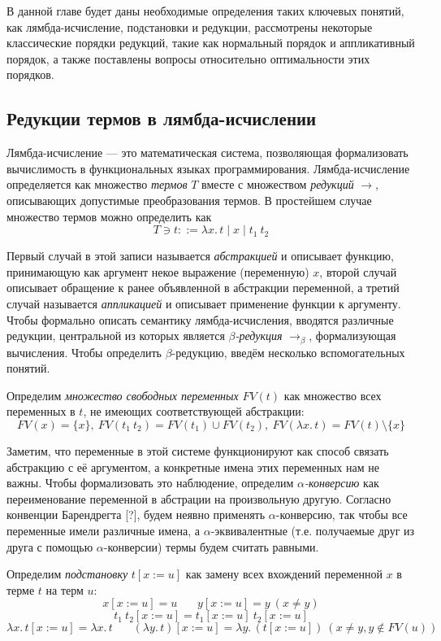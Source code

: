 \documentclass[../diploma.tex]{subfiles}
\begin{document}
\label{sec:1}

В данной главе будет даны необходимые определения таких ключевых понятий, как лямбда-исчисление, подстановки и редукции, рассмотрены некоторые классические порядки редукций, такие как нормальный порядок и аппликативный порядок, а также поставлены вопросы относительно оптимальности этих порядков.

\subsection{Редукции термов в лямбда-исчислении}

Лямбда-исчисление \cite{lambda_calculus} --- это математическая система, позволяющая формализовать вычислимость в функциональных языках программирования. Лямбда-исчисление определяется как множество \textit{термов} $T$ вместе с множеством \textit{редукций} $\rightarrow$, описывающих допустимые преобразования термов. В простейшем случае множество термов можно определить как
$$T \ni t ::= \lambda x.\, t \mid x \mid t_1\ t_2$$

Первый случай в этой записи называется \textit{абстракцией} и описывает функцию, принимающую как аргумент некое выражение (переменную) $x$, второй случай описывает обращение к ранее объявленной в абстракции переменной, а третий случай называется \textit{аппликацией} и описывает применение функции к аргументу. Чтобы формально описать семантику лямбда-исчисления, вводятся различные редукции, центральной из которых является \textit{$\beta$-редукция} $\rightarrow_\beta$, формализующая вычисления. Чтобы определить $\beta$-редукцию, введём несколько вспомогательных понятий.

Определим \textit{множество свободных переменных} $FV(t)$ как множество всех переменных в $t$, не имеющих соответствующей абстракции:
$$FV(x) = \{x\},\ FV(t_1\ t_2) = FV(t_1) \cup FV(t_2),\ FV(\lambda x.\, t) = FV(t) \setminus \{x\}$$

Заметим, что переменные в этой системе функционируют как способ связать абстракцию с её аргументом, а конкретные имена этих переменных нам не важны. Чтобы формализовать это наблюдение, определим \textit{$\alpha$-конверсию} как переименование переменной в абстрации на произвольную другую. Согласно конвенции Барендрегта [?], будем неявно применять $\alpha$-конверсию, так чтобы все переменные имели различные имена, а $\alpha$-эквивалентные (т.е. получаемые друг из друга с помощью $\alpha$-конверсии) термы будем считать равными.

Определим \textit{подстановку} $t [x := u]$ как замену всех вхождений переменной $x$ в терме $t$ на терм $u$:
$$x [x := u] = u\ \ \ \ \ \ \ \ y [x := u] = y\ (x \neq y)$$ $$t_1\ t_2 [x := u] = t_1 [x := u]\ t_2 [x := u]$$ $$\lambda x.\, t [x := u] = \lambda x.\, t \ \ \ \ \ \ \ \ (\lambda y.\, t) [x := u] = \lambda y.\, (t [x := u])\ (x \neq y, y \notin FV(u))$$
\end{document}
